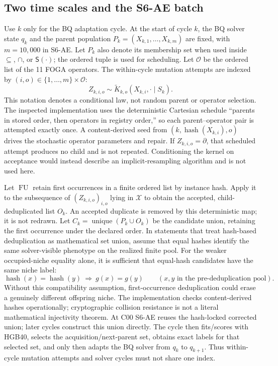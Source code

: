 \subsection{Two time scales and the S6-AE batch}
Use $k$ only for the BQ adaptation cycle. At the start of cycle $k$, the BQ
solver state $q_k$ and the parent population
$P_k=(X_{k,1},\ldots,X_{k,m})$ are fixed, with $m=10{,}000$ in S6-AE. Let
$P_k$ also denote its membership set when used inside $\subseteq$, $\cap$, or
$\mathsf S(\cdot)$; the ordered tuple is used for scheduling. Let
$\mathcal{O}$ be the ordered list of the 11 FOGA operators. The within-cycle
mutation attempts are indexed by $(i,o)\in\{1,\ldots,m\}\times\mathcal{O}$:
\[
 Z_{k,i,o}\sim \widetilde K_{k,o}(X_{k,i},\cdot\mid S_k).
\]
This notation denotes a conditional law, not random parent or operator
selection. The inspected implementation uses the deterministic Cartesian
schedule ``parents in stored order, then operators in registry order,'' so
each parent--operator pair is attempted exactly once. A content-derived seed
from $(k,\operatorname{hash}(X_{k,i}),o)$ drives the stochastic operator
parameters and repair. If $Z_{k,i,o}=\partial$, that scheduled attempt produces
no child and is not repeated. Conditioning the kernel on acceptance would
instead describe an implicit-resampling algorithm and is not used here.

Let $\operatorname{FU}$ retain first occurrences in a finite ordered list by
instance hash. Apply it to the subsequence of
$(Z_{k,i,o})_{i,o}$ lying in $\mathcal X$ to obtain the accepted,
child-deduplicated list $O_k$. An accepted duplicate is removed by this
deterministic map; it is not redrawn. Let
$C_k=\operatorname{unique}(P_k\cup O_k)$ be the candidate union, retaining
the first occurrence under the declared order. In statements that treat
hash-based deduplication as mathematical set union, assume that equal hashes
identify the same solver-visible phenotype on the realized finite pool.
For the weaker occupied-niche equality alone, it is sufficient that
equal-hash candidates have the same niche label:
\[
 \operatorname{hash}(x)=\operatorname{hash}(y)
 \ \Longrightarrow\ g(x)=g(y)
 \qquad (x,y\text{ in the pre-deduplication pool}).
\]
Without this compatibility assumption, first-occurrence deduplication could
erase a genuinely different offspring niche. The implementation checks
content-derived hashes operationally; cryptographic collision resistance is
not a literal mathematical injectivity theorem.
At C00 S6-AE reuses the hash-locked corrected union; later cycles construct
this union directly. The
cycle then fits/scores with HGB40, selects the acquisition/next-parent set,
obtains exact labels for that selected set, and only then adapts the BQ solver
from $q_k$ to $q_{k+1}$. Thus within-cycle mutation attempts and solver cycles
must not share one index.

